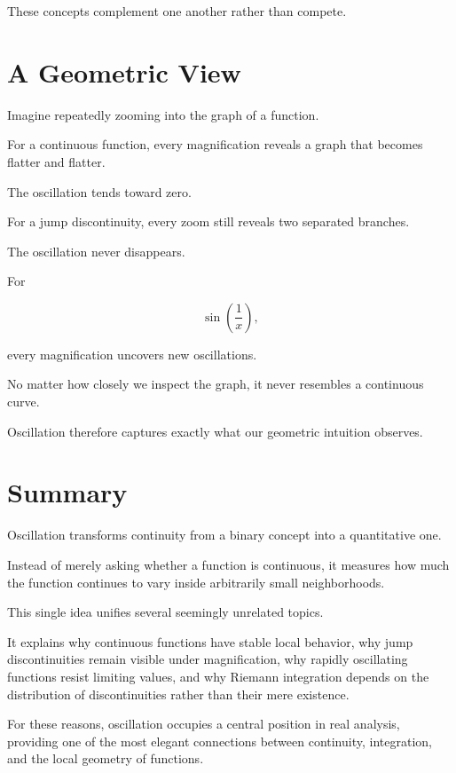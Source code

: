 \documentclass{essay}
\begin{document}
These concepts complement one another rather than compete.


\section{A Geometric View}

Imagine repeatedly zooming into the graph of a function.

For a continuous function, every magnification reveals a graph that becomes
flatter and flatter.

The oscillation tends toward zero.

For a jump discontinuity, every zoom still reveals two separated branches.

The oscillation never disappears.

For

\[
\sin\left(\frac1x\right),
\]

every magnification uncovers new oscillations.

No matter how closely we inspect the graph, it never resembles a continuous
curve.

Oscillation therefore captures exactly what our geometric intuition observes.


\section{Summary}

Oscillation transforms continuity from a binary concept into a quantitative one.

Instead of merely asking whether a function is continuous, it measures how much
the function continues to vary inside arbitrarily small neighborhoods.

This single idea unifies several seemingly unrelated topics.

It explains why continuous functions have stable local behavior, why jump
discontinuities remain visible under magnification, why rapidly oscillating
functions resist limiting values, and why Riemann integration depends on the
distribution of discontinuities rather than their mere existence.

For these reasons, oscillation occupies a central position in real analysis,
providing one of the most elegant connections between continuity, integration,
and the local geometry of functions.
\end{document}
